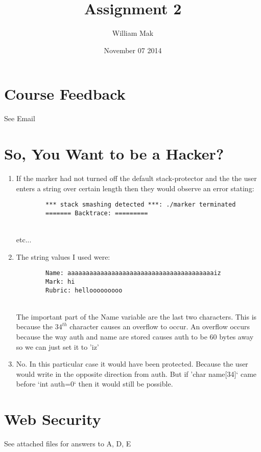 \documentclass{article}
\title{Assignment 2}
\author{William Mak}
\date{November 07 2014}
\begin{document}
\maketitle

\section{Course Feedback}
See Email

\section{So, You Want to be a Hacker?}
\begin{enumerate}[A]
	\item
		If the marker had not turned off the default stack-protector and the the
		user enters a string over certain length then they would observe an
		error stating:
		\begin{verbatim}
		*** stack smashing detected ***: ./marker terminated
		======= Backtrace: =========
		\end{verbatim}\\
		etc...
	\item
		The string values I used were:
		\begin{verbatim}
		Name: aaaaaaaaaaaaaaaaaaaaaaaaaaaaaaaaaaaaaaaaiz
		Mark: hi
		Rubric: hellooooooooo
		\end{verbatim}\\
		The important part of the Name variable are the last two characters.
		This is because the $34^{th}$ character causes an overflow to occur. An
		overflow occurs because the way auth and name are stored causes auth to 
		be 60 bytes away so we can just set it to 'iz'
	\item
		No. In this particular case it would have been protected. Because the
		user would write in the opposite direction from auth. But if 
		'char name[34]` came before `int auth=0` then it would still be 
		possible.
\end{enumerate}

\section{Web Security}
See attached files for answers to A, D, E
\end{document}
